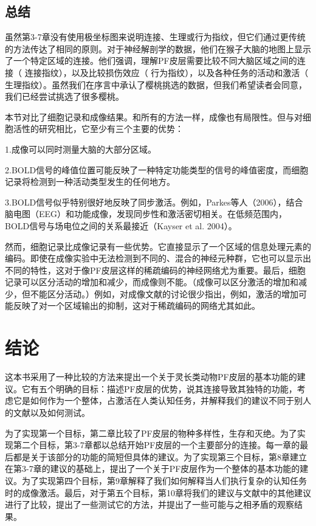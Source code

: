 \subsection{总结}
虽然第3-7章没有使用极坐标图来说明连接、生理或行为指纹，但它们通过更传统的方法传达了相同的原则。对于神经解剖学的数据，他们在猴子大脑的地图上显示了一个特定区域的连接。他们强调，理解PF皮层需要比较不同大脑区域之间的连接（ 连接指纹），以及比较损伤效应（ 行为指纹），以及各种任务的活动和激活（ 生理指纹）。虽然我们在序言中承认了樱桃挑选的数据，但我们希望读者会同意，我们已经尝试挑选了很多樱桃。
\par
本节对比了细胞记录和成像结果。和所有的方法一样，成像也有局限性。但与对细胞活性的研究相比，它至少有三个主要的优势：
\par 1.成像可以同时测量大脑的大部分区域。
\par 2.BOLD信号的峰值位置可能反映了一种特定功能类型的信号的峰值密度，而细胞记录将检测到一种活动类型发生的任何地方。
\par 3.BOLD信号似乎特别很好地反映了同步激活。例如，Parkes等人（2006），结合脑电图（EEG）和功能成像，发现同步性和激活密切相关。在低频范围内，BOLD信号与场电位之间的关系最接近（Kayser et al. 2004）。
\par 然而，细胞记录比成像记录有一些优势。它直接显示了一个区域的信息处理元素的编码。即使在成像实验中无法检测到不同的、混合的神经元种群，它也可以显示出不同的特性，这对于像PF皮层这样的稀疏编码的神经网络尤为重要。最后，细胞记录可以区分活动的增加和减少，而成像则不能。（成像可以区分激活的增加和减少，但不能区分活动。）例如，对成像文献的讨论很少指出，例如，激活的增加可能反映了对一个区域输出的抑制，这对于稀疏编码的网络尤其如此。

\section{结论}
这本书采用了一种比较的方法来提出一个关于灵长类动物PF皮层的基本功能的建议。它有五个明确的目标：描述PF皮层的优势，说其连接导致其独特的功能，考虑它是如何作为一个整体，占激活在人类认知任务，并解释我们的建议不同于别人的文献以及如何测试。
\par
为了实现第一个目标，第二章比较了PF皮层的物种多样性，生存和灭绝。为了实现第二个目标，第3-7章都以总结开始PF皮层的一个主要部分的连接。每一章的最后都是关于该部分的功能的简短但具体的建议。为了实现第三个目标，第8章建立在第3-7章的建议的基础上，提出了一个关于PF皮层作为一个整体的基本功能的建议。为了实现第四个目标，第9章解释了我们如何解释当人们执行复杂的认知任务时的成像激活。最后，对于第五个目标，第10章将我们的建议与文献中的其他建议进行了比较，提出了一些测试它的方法，并提出了一些可能与之相矛盾的观察结果。


